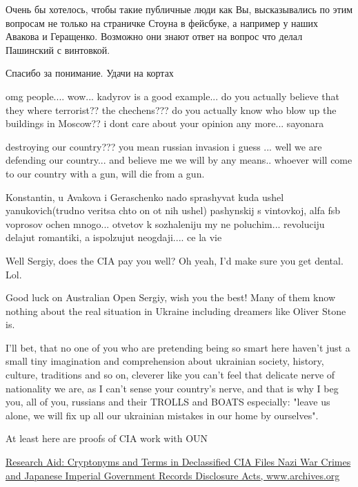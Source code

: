 \begin{itemize}
\begin{itemize}
Очень бы хотелось, чтобы такие публичные люди как Вы, высказывались по этим
вопросам не только на страничке Стоуна в фейсбуке, а например у наших Авакова и
Геращенко. Возможно они знают ответ на вопрос что делал Пашинский с винтовкой.

Спасибо за понимание. Удачи на кортах


omg people.... wow... kadyrov is a good example... do you actually believe that
they where terrorist?? the chechens??? do you actually know who blow up the
buildings in Moscow?? i dont care about your opinion any more... sayonara


destroying our country??? you mean russian invasion i guess ... well we are
defending our country... and believe me we will by any means.. whoever will come
to our country with a gun, will die from a gun.


Konstantin, u Avakova i Geraschenko nado sprashyvat kuda ushel yanukovich(trudno
veritsa chto on ot nih ushel) pashynskij s vintovkoj, alfa fsb voprosov ochen
mnogo... otvetov k sozhaleniju my ne poluchim... revoluciju delajut romantiki, a
ispolzujut neogdaji.... ce la vie



Well Sergiy, does the CIA pay you well? Oh yeah, I'd make sure you get dental.
Lol.


Good luck on Australian Open Sergiy, wish you the best! Many of them know
nothing about the real situation in Ukraine including dreamers like Oliver
Stone is.


I'll bet, that no one of you who are pretending being so smart here haven't
just a small tiny imagination and comprehension about ukrainian society,
history, culture, traditions and so on, cleverer like you can't feel that
delicate nerve of nationality we are, as I can't sense your country's nerve,
and that is why I beg you, all of you, russians and their TROLLS and BOATS
especially: "leave us alone, we will fix up all our ukrainian mistakes in our
home by ourselves".


At least here are proofs of CIA work with OUN

\href{https://www.archives.gov/files/iwg/declassified-records/rg-263-cia-records/second-release-lexicon.pdf}{%
Research Aid: Cryptonyms and Terms in Declassified CIA Files %
Nazi War Crimes and Japanese Imperial Government Records Disclosure Acts, %
www.archives.org%
}


\end{itemize}
\end{itemize}
